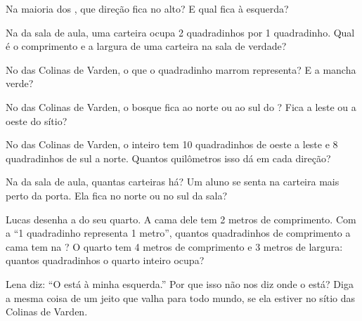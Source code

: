 \begin{exercise}[$\star$]\label{exo:g2:drawing-to-map:4}
Na maioria dos , que direção fica no alto? E qual fica à esquerda?
\end{exercise}

\begin{exercise}[$\star$]\label{exo:g2:drawing-to-map:5}
Na  da sala de aula, uma carteira ocupa 2 quadradinhos por 1
quadradinho. Qual é o comprimento e a largura de uma carteira na sala de verdade?
\end{exercise}

\begin{exercise}[$\star$]\label{exo:g2:drawing-to-map:6}
No  das Colinas de Varden, o que o quadradinho marrom representa? E a
mancha verde?
\end{exercise}

\begin{exercise}[$\star\star$]\label{exo:g2:drawing-to-map:7}
No  das Colinas de Varden, o bosque fica ao norte ou ao sul do ? Fica a
leste ou a oeste do sítio?
\end{exercise}

\begin{exercise}[$\star\star$]\label{exo:g2:drawing-to-map:8}
No  das Colinas de Varden, o  inteiro tem 10 quadradinhos de oeste a
leste e 8 quadradinhos de sul a norte. Quantos quilômetros isso dá em cada
direção?
\end{exercise}

\begin{exercise}[$\star\star$]\label{exo:g2:drawing-to-map:9}
Na  da sala de aula, quantas carteiras há? Um aluno se senta na
carteira mais perto da porta. Ela fica no norte ou no sul da sala?
\end{exercise}

\begin{exercise}[$\star\star$]\label{exo:g2:drawing-to-map:10}
Lucas desenha a  do seu quarto. A cama dele tem 2 metros de
comprimento. Com a  ``1 quadradinho representa 1 metro'', quantos
quadradinhos de comprimento a cama tem na ? O quarto tem 4 metros de
comprimento e 3 metros de largura: quantos quadradinhos o quarto inteiro ocupa?
\end{exercise}

\begin{exercise}[$\star\star$]\label{exo:g2:drawing-to-map:11}
Lena diz: ``O  está à minha esquerda.'' Por que isso não nos diz onde
o  está? Diga a mesma coisa de um jeito que valha para todo mundo, se
ela estiver no sítio das Colinas de Varden.
\end{exercise}
